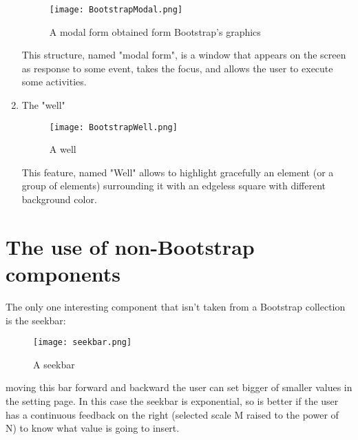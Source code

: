 \begin{enumerate}
\begin{figure}[H]
\centering
\texttt{[image: BootstrapModal.png]} 
\caption{A modal form obtained form Bootstrap's graphics}
\end{figure}

This structure, named "modal form", is a window that appears on the screen as response to some event, takes the focus, and allows the user to execute some activities. 

\item The "well"

\begin{figure}[H]
\centering
\texttt{[image: BootstrapWell.png]} 
\caption{A well}
\end{figure}

This feature, named "Well" allows to highlight gracefully an element (or a group of elements) surrounding it with an edgeless square with different background color. 

\end{enumerate}

\section{The use of non-Bootstrap components}

The only one interesting component that isn't taken from a Bootstrap collection is the seekbar: 

\begin{figure}[H]
\centering
\texttt{[image: seekbar.png]} 
\caption{A seekbar}
\end{figure}

moving this bar forward and backward the user can set bigger of smaller values in the setting page. In this case the seekbar is exponential, so is better if the user has a continuous feedback on the right (selected scale M raised to the power of N) to know what value is going to insert.